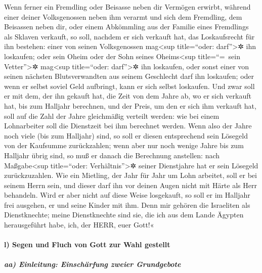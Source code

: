 Wenn ferner ein Fremdling oder Beisasse neben dir
Vermögen erwirbt, während einer deiner Volksgenossen neben ihm verarmt
und sich dem Fremdling, dem Beisassen neben dir, oder einem Abkömmling
aus der Familie eines Fremdlings als Sklaven verkauft, so
soll, nachdem er sich verkauft hat, das Loskaufsrecht für ihn bestehen:
einer von seinen Volksgenossen mag\textless sup title=``oder:
darf''\textgreater✲ ihn loskaufen; oder sein Oheim oder
der Sohn seines Oheims\textless sup title=``=~sein Vetter''\textgreater✲
mag\textless sup title=``oder: darf''\textgreater✲ ihn loskaufen, oder
sonst einer von seinen nächsten Blutsverwandten aus seinem Geschlecht
darf ihn loskaufen; oder wenn er selbst soviel Geld aufbringt, kann er
sich selbst loskaufen. Und zwar soll er mit dem, der ihn
gekauft hat, die Zeit von dem Jahre ab, wo er sich verkauft hat, bis zum
Halljahr berechnen, und der Preis, um den er sich ihm verkauft hat, soll
auf die Zahl der Jahre gleichmäßig verteilt werden: wie bei einem
Lohnarbeiter soll die Dienstzeit bei ihm berechnet werden.
Wenn also der Jahre noch viele (bis zum Halljahr) sind,
so soll er diesen entsprechend sein Lösegeld von der Kaufsumme
zurückzahlen; wenn aber nur noch wenige Jahre bis zum
Halljahr übrig sind, so muß er danach die Berechnung anstellen: nach
Maßgabe\textless sup title=``oder: Verhältnis''\textgreater✲ seiner
Dienstjahre hat er sein Lösegeld zurückzuzahlen. Wie ein
Mietling, der Jahr für Jahr um Lohn arbeitet, soll er bei seinem Herrn
sein, und dieser darf ihn vor deinen Augen nicht mit Härte als Herr
behandeln. Wird er aber nicht auf diese Weise losgekauft,
so soll er im Halljahr frei ausgehen, er und seine Kinder mit ihm.
Denn mir gehören die Israeliten als Dienstknechte; meine
Dienstknechte sind sie, die ich aus dem Lande Ägypten herausgeführt
habe, ich, der HERR, euer Gott!«

\hypertarget{l-segen-und-fluch-von-gott-zur-wahl-gestellt}{%
\paragraph{l) Segen und Fluch von Gott zur Wahl
gestellt}\label{l-segen-und-fluch-von-gott-zur-wahl-gestellt}}

\hypertarget{aa-einleitung-einschuxe4rfung-zweier-grundgebote}{%
\subparagraph{aa) Einleitung: Einschärfung zweier
Grundgebote}\label{aa-einleitung-einschuxe4rfung-zweier-grundgebote}}

